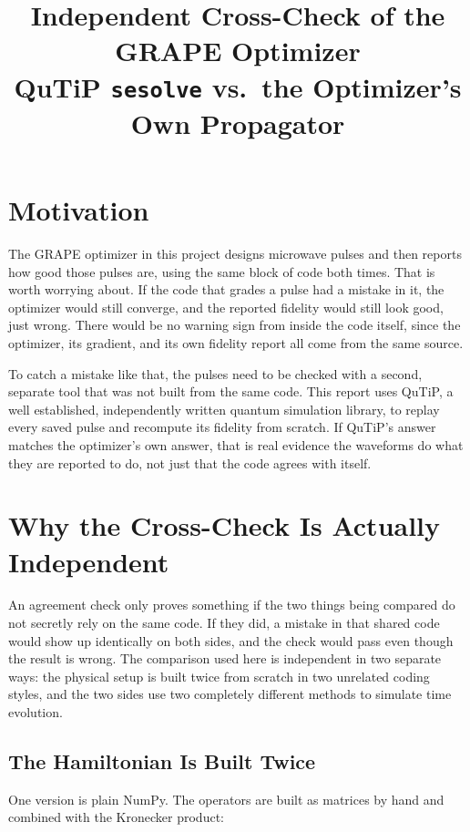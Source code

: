 \documentclass[11pt]{article}
\title{Independent Cross-Check of the GRAPE Optimizer\\
\large QuTiP \texttt{sesolve} vs.\ the Optimizer's Own Propagator}
\author{}
\date{}
\begin{document}
\sloppy
\maketitle

\section{Motivation}
\label{sec:motivation}

The GRAPE optimizer in this project designs microwave pulses and then reports how good those
pulses are, using the same block of code both times. That is worth worrying about. If the code
that grades a pulse had a mistake in it, the optimizer would still converge, and the reported
fidelity would still look good, just wrong. There would be no warning sign from inside the code
itself, since the optimizer, its gradient, and its own fidelity report all come from the same
source.

To catch a mistake like that, the pulses need to be checked with a second, separate tool that was
not built from the same code. This report uses QuTiP, a well established, independently written
quantum simulation library, to replay every saved pulse and recompute its fidelity from scratch.
If QuTiP's answer matches the optimizer's own answer, that is real evidence the waveforms do what
they are reported to do, not just that the code agrees with itself.

\section{Why the Cross-Check Is Actually Independent}
\label{sec:independence}

An agreement check only proves something if the two things being compared do not secretly rely on
the same code. If they did, a mistake in that shared code would show up identically on both sides,
and the check would pass even though the result is wrong. The comparison used here is independent
in two separate ways: the physical setup is built twice from scratch in two unrelated coding
styles, and the two sides use two completely different methods to simulate time evolution.

\subsection{The Hamiltonian Is Built Twice}

One version is plain NumPy. The operators are built as matrices by hand and combined with the
Kronecker product:
\end{document}
